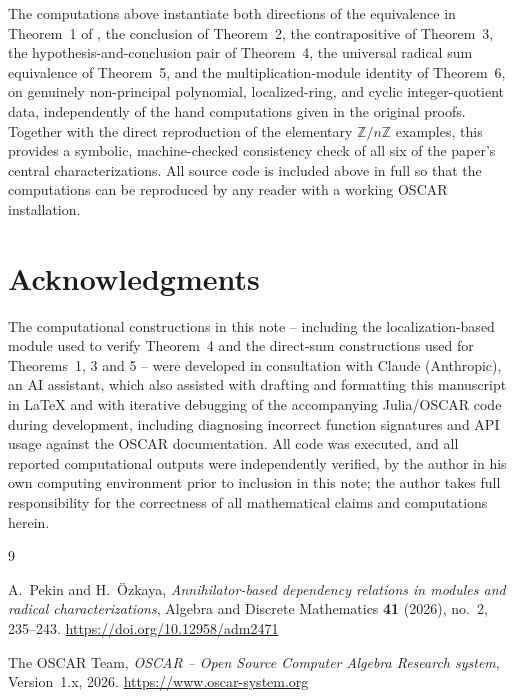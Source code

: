 \documentclass[11pt]{article}
\begin{document}
The computations above instantiate both directions of the equivalence in
Theorem~1 of \cite{pekin-ozkaya-2026}, the conclusion of Theorem~2, the
contrapositive of Theorem~3, the hypothesis-and-conclusion pair of
Theorem~4, the universal radical sum equivalence of Theorem~5, and the
multiplication-module identity of Theorem~6, on genuinely non-principal
polynomial, localized-ring, and cyclic integer-quotient data,
independently of the hand computations given in the original proofs.
Together with the direct reproduction of the elementary $\mathbb
Z/n\mathbb Z$ examples, this provides a symbolic, machine-checked
consistency check of all six of the paper's central characterizations.
All source
code is included above in full so that the computations can be
reproduced by any reader with a working OSCAR installation.

\section*{Acknowledgments}

The computational constructions in this note -- including the
localization-based module used to verify Theorem~4 and the direct-sum
constructions used for Theorems~1, 3 and 5 -- were developed in
consultation with Claude (Anthropic), an AI assistant, which also
assisted with drafting and formatting this manuscript in \LaTeX{} and
with iterative debugging of the accompanying Julia/OSCAR code during
development, including diagnosing incorrect function signatures and
API usage against the OSCAR documentation. All code was executed, and
all reported computational outputs were independently verified, by the
author in his own computing environment prior to inclusion in this
note; the author takes full responsibility for the correctness of all
mathematical claims and computations herein.

\begin{thebibliography}{9}

A.~Pekin and H.~\"Ozkaya,
\emph{Annihilator-based dependency relations in modules and radical
characterizations},
Algebra and Discrete Mathematics \textbf{41} (2026), no.~2, 235--243.
\url{https://doi.org/10.12958/adm2471}

The OSCAR Team,
\emph{OSCAR -- Open Source Computer Algebra Research system},
Version~1.x, 2026.
\url{https://www.oscar-system.org}

\end{thebibliography}
\end{document}
